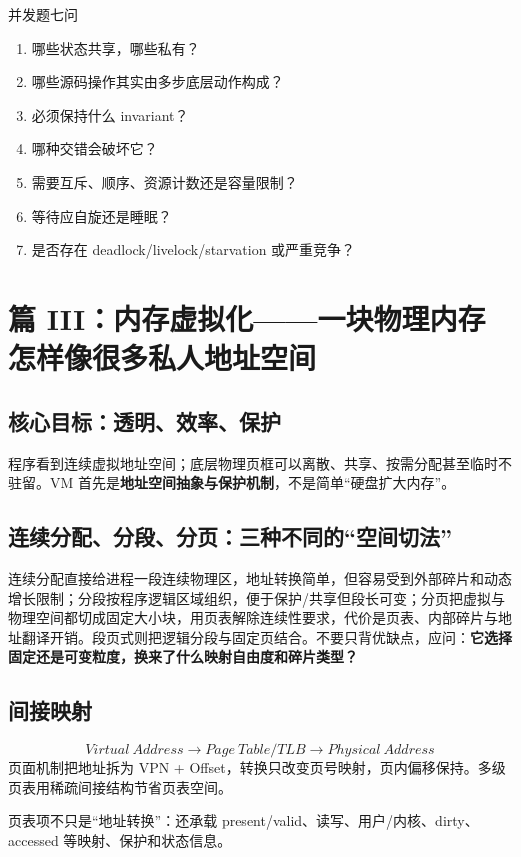 \documentclass[11pt,a4paper,openany]{ctexbook}
\newcommand{\key}[1]{\textbf{\color{deep}#1}}
\begin{document}
\begin{examBox}{并发题七问}
\begin{enumerate}
  \item 哪些状态共享，哪些私有？
  \item 哪些源码操作其实由多步底层动作构成？
  \item 必须保持什么 invariant？
  \item 哪种交错会破坏它？
  \item 需要互斥、顺序、资源计数还是容量限制？
  \item 等待应自旋还是睡眠？
  \item 是否存在 deadlock/livelock/starvation 或严重竞争？
\end{enumerate}
\end{examBox}

\section{篇 III：内存虚拟化——一块物理内存怎样像很多私人地址空间}

\subsection{核心目标：透明、效率、保护}
程序看到连续虚拟地址空间；底层物理页框可以离散、共享、按需分配甚至临时不驻留。VM 首先是\key{地址空间抽象与保护机制}，不是简单“硬盘扩大内存”。


\subsection{连续分配、分段、分页：三种不同的“空间切法”}
连续分配直接给进程一段连续物理区，地址转换简单，但容易受到外部碎片和动态增长限制；分段按程序逻辑区域组织，便于保护/共享但段长可变；分页把虚拟与物理空间都切成固定大小块，用页表解除连续性要求，代价是页表、内部碎片与地址翻译开销。段页式则把逻辑分段与固定页结合。不要只背优缺点，应问：\textbf{它选择固定还是可变粒度，换来了什么映射自由度和碎片类型？}

\subsection{间接映射}
\[
\boxed{Virtual\ Address\rightarrow Page\ Table/TLB\rightarrow Physical\ Address}
\]
页面机制把地址拆为 VPN + Offset，转换只改变页号映射，页内偏移保持。多级页表用稀疏间接结构节省页表空间。

页表项不只是“地址转换”：还承载 present/valid、读写、用户/内核、dirty、accessed 等映射、保护和状态信息。
\end{document}
